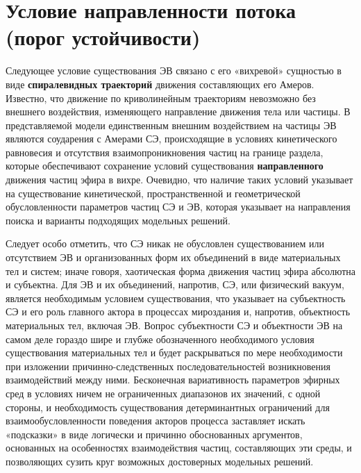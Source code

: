 \section{Условие направленности потока (порог устойчивости)}

Следующее условие существования ЭВ связано с его «вихревой» сущностью в виде \textbf{спиралевидных траекторий} движения составляющих его Амеров. Известно, что движение по криволинейным траекториям невозможно без внешнего воздействия, изменяющего направление движения тела или частицы. В представляемой модели единственным внешним воздействием на частицы ЭВ являются соударения с Амерами СЭ, происходящие в условиях кинетического равновесия и отсутствия взаимопроникновения частиц на границе раздела, которые обеспечивают сохранение условий существования \textbf{направленного} движения частиц эфира в вихре. Очевидно, что наличие таких условий указывает на существование кинетической, пространственной и геометрической обусловленности параметров частиц СЭ и ЭВ, которая указывает на направления поиска и варианты подходящих модельных решений.

Следует особо отметить, что СЭ никак не обусловлен существованием или отсутствием ЭВ и организованных форм их объединений в виде материальных тел и систем; иначе говоря, хаотическая форма движения частиц эфира абсолютна и субъектна. Для ЭВ и их объединений, напротив, СЭ, или физический вакуум, является необходимым условием существования, что указывает на субъектность СЭ и его роль главного актора в процессах мироздания и, напротив, объектность материальных тел, включая ЭВ. Вопрос субъектности СЭ и объектности ЭВ на самом деле гораздо шире и глубже обозначенного необходимого условия существования материальных тел и будет раскрываться по мере необходимости при изложении причинно-следственных последовательностей возникновения взаимодействий между ними. Бесконечная вариативность параметров эфирных сред в условиях ничем не ограниченных диапазонов их значений, с одной стороны, и необходимость существования детерминантных ограничений для взаимообусловленности поведения акторов процесса заставляет искать «подсказки» в виде логически и причинно обоснованных аргументов, основанных на особенностях взаимодействия частиц, составляющих эти среды, и позволяющих сузить круг возможных достоверных модельных решений.

